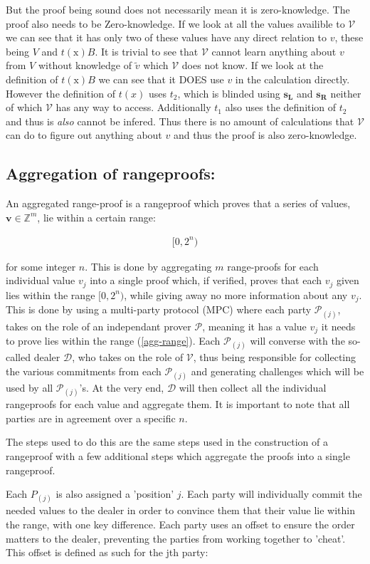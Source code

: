 \documentclass{article}
\newcommand{\eqn}[2]{\begin{equation}\label{#1}\begin{split}#2\end{split}\end{equation}}
\renewcommand{\vec}[1]{\boldsymbol{#1}}
\newcommand{\ran}[1]{\mathrm{#1}}
\newcommand{\vecran}[1]{\mathbf{#1}}
\newcommand{\V}{\mathcal{V}}
\renewcommand{\P}{\mathcal{P}}
\newcommand{\D}{\mathcal{D}}
\newcommand{\Z}{\mathbb{Z}}
\newcommand{\tv}{\widetilde{v}}
\begin{document}
But the proof being sound does not necessarily mean it is
zero-knowledge. The proof also needs to be Zero-knowledge. If we look
at all the values availible to $\V$ we can see that it has only two
of these values have any direct relation to $v$, these being $V$ and
$t(\ran{x})B$. It is trivial to see that $\V$ cannot learn anything
about $v$ from $V$ without knowledge of $\tv$ which $\V$ does not
know. If we look at the definition of $t(\ran{x})B$ we can see that
it DOES use $v$ in the calculation directly. However the definition
of $t(x)$ uses $t_2$, which is blinded using $\vecran{s_L}$ and
$\vecran{s_R}$ neither of which $\V$ has any way to access. Additionally
$t_1$ also uses the definition of $t_2$ and thus is \textit{also} cannot
be infered. Thus there is no amount of calculations that $\V$ can do to
figure out anything about $v$ and thus the proof is also zero-knowledge.

\subsection{Aggregation of rangeproofs:}

An aggregated range-proof is a rangeproof which proves that a series
of values, $\vec{v} \in \Z^m$, lie within a certain range:

\eqn{agg-range}{
	[0,2^n)
}

for some integer $n$. This is done by aggregating $m$ range-proofs for
each individual value $v_j$ into a single proof which, if verified,
proves that each $v_j$ given lies within the range $[0,2^n)$, while
giving away no more information about any $v_j$. This is done by using
a multi-party protocol (MPC) where each party $\P_{(j)}$, takes on the
role of an independant prover $\P$, meaning it has a value $v_j$ it
needs to prove lies within the range (\ref{agg-range}). Each $\P_{(j)}$
will converse with the so-called dealer $\D$, who takes on the role
of $\V$, thus being responsible for collecting the various commitments
from each $\P_{(j)}$ and generating challenges which will be used by all
$\P_{(j)}$'s. At the very end, $\D$ will then collect all the individual
rangeproofs for each value and aggregate them. It is important to note
that all parties are in agreement over a specific $n$.

The steps used to do this are the same steps used in the construction of a rangeproof with a few additional steps which aggregate the proofs into a single rangeproof. 

Each $P_{(j)}$ is
also assigned a 'position' $j$. Each party will individually commit
the needed values to the dealer in order to convince them that their
value lie within the range, with one key difference. Each party uses
an offset to ensure the order matters to the dealer, preventing the
parties from working together to 'cheat'. This offset is defined as
such for the jth party:
\end{document}

